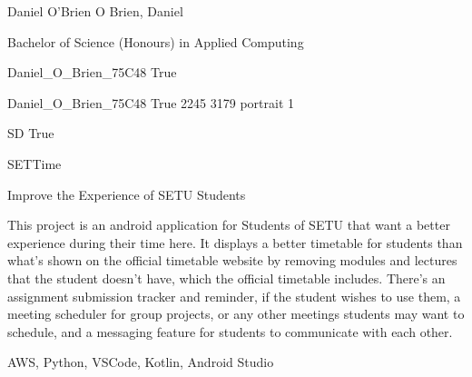 \documentclass[twoside]{report}
\begin{document}
\begingroup{}\relax



\def\Key{Daniel_O_Brien_75C48}

{Daniel O'Brien}
{O Brien, Daniel}

{Bachelor of Science (Honours) in Applied Computing}

{Daniel_O_Brien_75C48}
{True}

{Daniel_O_Brien_75C48}
{True}
{2245}
{3179}
{portrait}
{1}

{SD}
{True}

{SETTime}

{Improve the Experience of SETU Students}

{This project is an android application for Students of SETU that want a better experience during their time here. It displays a better timetable for students than what's shown on the official timetable website by removing modules and lectures that the student doesn't have, which the official timetable includes. There's an assignment submission tracker and reminder, if the student wishes to use them, a meeting scheduler for group projects, or any other meetings students may want to schedule, and a messaging feature for students to communicate with each other.}

{AWS, Python, VSCode, Kotlin, Android Studio}
\end{document}
